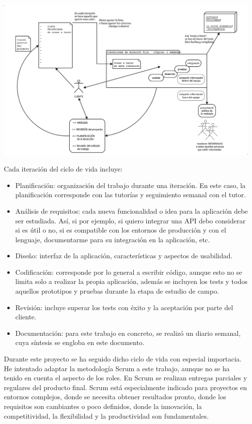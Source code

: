 \begin{center}
	\includegraphics[width=14cm]{./images/metodologia-agil.png}
	\label{fig:metodologia}
\end{center}

\vspace*{0.1in}
Cada iteración del ciclo de vida incluye:
\begin{itemize}
	\item Planificación: organización del trabajo durante una iteración. En este caso, la planificación corresponde con las tutorías y seguimiento semanal con el tutor.
	\item Análisis de requisitos: cada nueva funcionalidad o idea para la aplicación debe ser estudiada. Así, si por ejemplo, si quiero integrar una API debo considerar si es útil o no, si es compatible con los entornos de producción y con el lenguaje, documentarme para su integración en la aplicación, etc.
	\item Diseño: interfaz de la aplicación, características y aspectos de usabilidad.
	\item Codificación: corresponde por lo general a escribir código, aunque esto no se limita solo a realizar la propia aplicación, además se incluyen los tests y todos aquellos prototipos y pruebas durante la etapa de estudio de campo.
	\item Revisión: incluye superar los tests con éxito y la aceptación por parte del cliente.
	\item Documentación: para este trabajo en concreto, se realizó un diario semanal, cuya síntesis se engloba en este documento.
\end{itemize}

Durante este proyecto se ha seguido dicho ciclo de vida con especial importacia. He intentado adaptar la metodología Scrum a este trabajo, aunque no se ha tenido en cuenta  el aspecto de los roles. En Scrum se realizan entregas parciales y regulares del producto final. Scrum está especialmente indicado para proyectos en entornos complejos, donde se necesita obtener resultados pronto, donde los requisitos son cambiantes o poco definidos, donde la innovación, la competitividad, la flexibilidad y la productividad son fundamentales. \\

%



